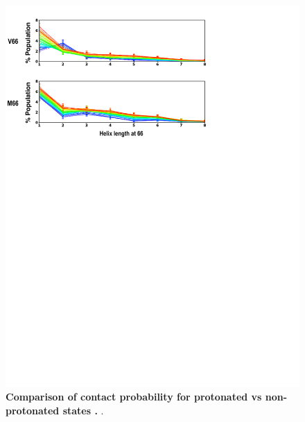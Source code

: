 \documentclass[journal=jacsat,manuscript=article]{achemso}
\begin{document}
\begin{figure}[!ht]
 \includegraphics[scale=0.5,width=\textwidth,trim={0 0cm 0 0},clip]{../figures/S6.pdf}
\caption{{\bf Comparison of contact probability for protonated vs non-protonated states .}
.
 }
\label{S6} 
\end{figure}
\end{document}
